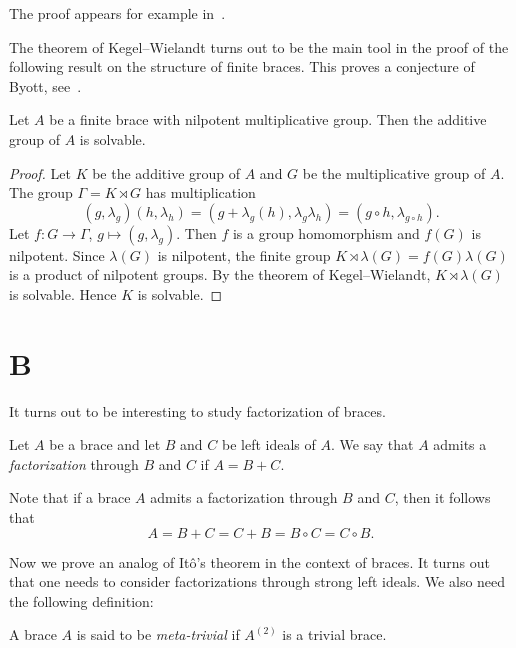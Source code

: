 The proof appears for example in~\cite[Theorem 2.4.3]{MR1211633}. 

The theorem of Kegel--Wielandt turns out to be the main tool in the proof of the following result 
on the structure of finite braces. 
This proves a conjecture 
of Byott, see~\cite{MR3425626}.

\begin{theorem}
\label{thm:mul_nilpotent}
Let $A$ be a finite brace with nilpotent multiplicative group. Then 
the additive group of $A$ is solvable.
\end{theorem}

\begin{proof}
    Let $K$ be the additive group of $A$ and $G$ be the multiplicative group of $A$. The group
    $\Gamma=K\rtimes G$ has multiplication
    \[
    (g,\lambda_g)(h,\lambda_h)=(g+\lambda_g(h),\lambda_g\lambda_h)=(g\circ h,\lambda_{g\circ h}).
    \]
    Let $f\colon G\to\Gamma$, $g\mapsto(g,\lambda_g)$. 
    Then $f$ is a group homomorphism and $f(G)$ is nilpotent. 
    Since $\lambda(G)$ is nilpotent, the finite group 
    $K\rtimes\lambda(G)=f(G)\lambda(G)$ is a product of nilpotent groups. 
    By the theorem of Kegel--Wielandt, $K\rtimes\lambda(G)$ 
    is solvable. Hence $K$ is solvable. 
\end{proof}

\section*{{{\thesection}B}}

It turns out to be interesting to study factorization of braces. 

\begin{definition}
    Let $A$ be a brace and let $B$ and $C$ be left ideals of $A$. We say
    that $A$ admits a \emph{factorization} through $B$ and $C$ if $A=B+C$.
\end{definition}

Note that if a brace $A$ admits a factorization through $B$ and $C$, then  
it follows that
\[
A=B+C=C+B=B\circ C=C\circ B.
\]

Now we prove an analog of It\^o's theorem in the context of braces. 
It turns out that one needs to consider factorizations through strong left ideals. We also need
the following
definition: 

\begin{definition}
A brace $A$ is said to be \emph{meta-trivial} if $A^{(2)}$ is a trivial brace. 
\end{definition}

